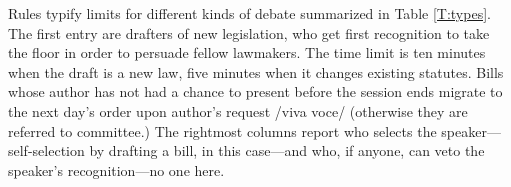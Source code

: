 \documentclass[letter,12pt]{article}
\begin{document}

Rules typify limits for different kinds of debate summarized in Table \ref{T:types}. The first entry are drafters of new legislation, who get first recognition to take the floor in order to persuade fellow lawmakers. The time limit is ten minutes when the draft is a new law, five minutes when it changes existing statutes. Bills whose author has not had a chance to present before the session ends migrate to the next day's order upon author's request /viva voce/ (otherwise they are referred to committee.) The rightmost columns report who selects the speaker---self-selection by drafting a bill, in this case---and who, if anyone, can veto the speaker's recognition---no one here. %
\end{document}
